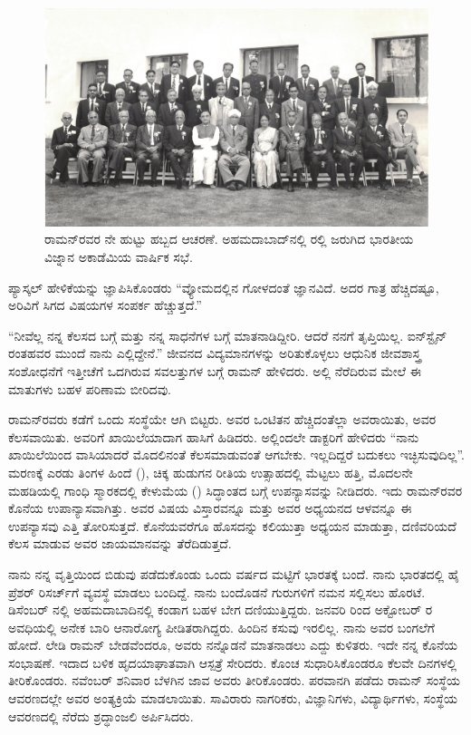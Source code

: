 \begin{figure}[!htbp]
\includegraphics[scale=0.32]{"images/13.jpg"}
\caption{ ರಾಮನ್‌ರವರ ನೇ ಹುಟ್ಟು ಹಬ್ಬದ ಆಚರಣೆ. ಅಹಮದಾಬಾದ್‌ನಲ್ಲಿ ರಲ್ಲಿ ಜರುಗಿದ ಭಾರತೀಯ ವಿಜ್ನಾನ ಅಕಾಡೆಮಿಯ ವಾರ್ಷಿಕ ಸಭೆ.}\label{chap2-fig03}
\end{figure}

ಪ್ಯಾಸ್ಕಲ್ ಹೇಳಿಕೆಯನ್ನು ಜ್ಞಾಪಿಸಿಕೊಂಡರು\enginline{-} “ವ್ಯೋಮದಲ್ಲಿನ ಗೋಳದಂತೆ ಜ್ಞಾನವಿದೆ. ಅದರ ಗಾತ್ರ ಹೆಚ್ಚಿದಷ್ಟೂ, ಅರಿವಿಗೆ ಸಿಗದ ವಿಷಯಗಳ ಸಂಪರ್ಕ ಹೆಚ್ಚುತ್ತದೆ.”

 “ನೀವೆಲ್ಲ ನನ್ನ ಕೆಲಸದ ಬಗ್ಗೆ ಮತ್ತು ನನ್ನ ಸಾಧನೆಗಳ ಬಗ್ಗೆ ಮಾತನಾಡಿದ್ದೀರಿ. ಆದರೆ ನನಗೆ ತೃಪ್ತಿಯಿಲ್ಲ. ಐನ್‍ಸ್ಟೈನ್ ರಂತಹವರ ಮುಂದೆ ನಾನು ಎಲ್ಲಿದ್ದೇನೆ.” ಜೀವನದ ವಿದ್ಯಮಾನಗಳನ್ನು ಅರಿತುಕೊಳ್ಳಲು ಆಧುನಿಕ ಜೀವಶಾಸ್ತ್ರ ಸಂಶೋಧನೆಗೆ ಇತ್ತೀಚೆಗೆ ಒದಗಿರುವ ಸವಲತ್ತುಗಳ ಬಗ್ಗೆ ರಾಮನ್ ಹೇಳಿದರು. ಅಲ್ಲಿ ನೆರೆದಿರುವ ಮೇಲೆ ಈ ಮಾತುಗಳು ಬಹಳ ಪರಿಣಾಮ ಬೀರಿದವು.

ರಾಮನ್‍ರವರು ಕಡೆಗೆ ಒಂದು ಸಂಸ್ಥೆಯೇ ಆಗಿ ಬಿಟ್ಟರು. ಅವರ ಒಂಟಿತನ ಹೆಚ್ಚಿದಂತೆಲ್ಲಾ ಅವರಾಯಿತು, ಅವರ ಕೆಲಸವಾಯಿತು. ಅವರಿಗೆ ಖಾಯಿಲೆಯಾದಾಗ ಹಾಸಿಗೆ ಹಿಡಿದರು. ಅಲ್ಲಿಂದಲೇ ಡಾಕ್ಟರಿಗೆ ಹೇಳಿದರು\enginline{-} “ನಾನು ಖಾಯಿಲೆಯಿಂದ ವಾಸಿಯಾದರೆ ಮೊದಲಿನಂತೆ ಕೆಲಸಮಾಡುವಂತೆ ಆಗಬೇಕು. ಇಲ್ಲದಿದ್ದರೆ ಬದುಕಲು ಇಚ್ಛಿಸುವುದಿಲ್ಲ”. ಮರಣಕ್ಕೆ ಎರಡು ತಿಂಗಳ ಹಿಂದೆ (), ಚಿಕ್ಕ ಹುಡುಗನ ರೀತಿಯ ಉತ್ಸಾಹದಲ್ಲಿ ಮೆಟ್ಟಲು ಹತ್ತಿ, ಮೊದಲನೇ ಮಹಡಿಯಲ್ಲಿ ಗಾಂಧಿ ಸ್ಮಾರಕದಲ್ಲಿ ಕೇಳುಮೆಯ () ಸಿದ್ಧಾಂತದ ಬಗ್ಗೆ ಉಪನ್ಯಾಸವನ್ನು ನೀಡಿದರು. ಇದು ರಾಮನ್‍ರವರ ಕೊನೆಯ ಉಪಾನ್ಯಾಸವಾಗಿತ್ತು. ಅವರ ವಿಷಯ ವಿಸ್ತಾರವನ್ನೂ ಮತ್ತು ಅವರ ಅಧ್ಯಯನದ ಆಳವನ್ನೂ ಈ ಉಪನ್ಯಾಸವು ಎತ್ತಿ ತೋರಿಸುತ್ತದೆ. ಕೊನೆಯವರೆಗೂ ಹೊಸದನ್ನು ಕಲಿಯುತ್ತಾ ಅಧ್ಯಯನ ಮಾಡುತ್ತಾ, ದಣಿವರಿಯದೆ ಕೆಲಸ ಮಾಡುವ ಅವರ ಜಾಯಮಾನವನ್ನು ತೆರೆದಿಡುತ್ತದೆ.

ನಾನು ನನ್ನ ವೃತ್ತಿಯಿಂದ ಬಿಡುವು ಪಡೆದುಕೊಂಡು ಒಂದು ವರ್ಷದ ಮಟ್ಟಿಗೆ ಭಾರತಕ್ಕೆ ಬಂದೆ. ನಾನು ಭಾರತದಲ್ಲಿ ಹೈ ಪ್ರೆಶರ್ ರಿಸರ್ಚ್‌ಗೆ ವ್ಯವಸ್ಥೆ ಮಾಡಲು ಬಂದಿದ್ದೆ. ನಾನು ಬಂದೊಡನೆ ಗುರುಗಳಿಗೆ ನಮನ ಸಲ್ಲಿಸಲು ಹೊರಟೆ.  ಡಿಸೆಂಬರ್ ನಲ್ಲಿ ಅಹಮದಾಬಾದಿನಲ್ಲಿ ಕಂಡಾಗ ಬಹಳ ಬೇಗ ದಣಿಯುತ್ತಿದ್ದರು. ಜನವರಿ  ರಿಂದ ಅಕ್ಟೋಬರ್  ರ ಅವಧಿಯಲ್ಲಿ ಅನೇಕ ಬಾರಿ ಆನಾರೋಗ್ಯ ಪೀಡಿತರಾಗಿದ್ದರು. ಹಿಂದಿನ ಕಸುವು ಇರಲಿಲ್ಲ. ನಾನು ಅವರ ಬಂಗಲೆಗೆ ಹೋದೆ. ಲೇಡಿ ರಾಮನ್ ಬೇಡವೆಂದರೂ, ಅವರು ನನ್ನೊಡನೆ ಮಾತನಾಡಲು ಎದ್ದು ಕುಳಿತರು. ಇದೇ ನನ್ನ ಕೊನೆಯ ಸಂಭಾಷಣೆ. ಇದಾದ ಬಳಿಕ ಹೃದಯಾಘಾತವಾಗಿ ಆಸ್ಪತ್ರೆ ಸೇರಿದರು. ಕೊಂಚ ಸುಧಾರಿಸಿಕೊಂಡರೂ ಕೆಲವೇ ದಿನಗಳಲ್ಲಿ ತೀರಿಕೊಂಡರು. ನವೆಂಬರ್  ಶನಿವಾರ ಬೆಳಗಿನ ಜಾವ ಅವರು ತೀರಿಕೊಂಡರು. ಪರವಾನಗಿ ಪಡೆದು ರಾಮನ್ ಸಂಸ್ಥೆಯ ಆವರಣದಲ್ಲೇ ಅವರ ಅಂತ್ಯಕ್ರಿಯೆ ಮಾಡಲಾಯಿತು. ಸಾವಿರಾರು ನಾಗರಿಕರು, ವಿಜ್ಞಾನಿಗಳು, ವಿದ್ಯಾರ್ಥಿಗಳು, ಸಂಸ್ಥೆಯ ಆವರಣದಲ್ಲಿ ನೆರೆದು ಶ್ರದ್ಧಾಂಜಲಿ ಅರ್ಪಿಸಿದರು.

